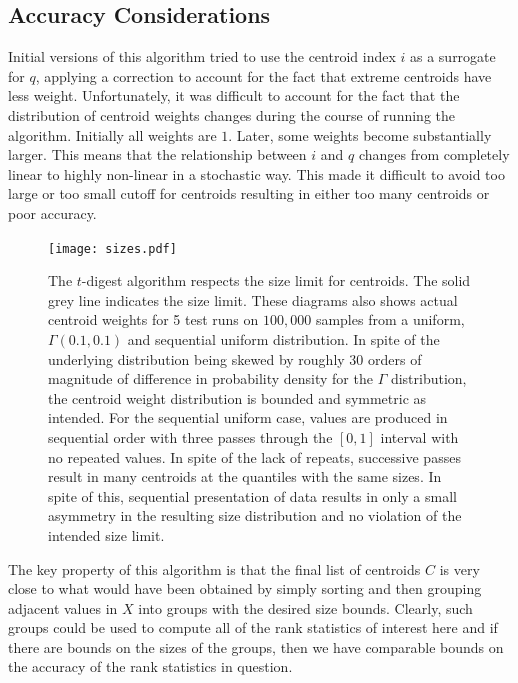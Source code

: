 \documentclass[11pt]{amsart}
\begin{document}
\subsection{Accuracy Considerations}
Initial versions of this algorithm tried to use the centroid index $i$ as a surrogate for $q$, applying a correction to account for the fact that extreme centroids have less weight.  Unfortunately, it was difficult to account for the fact that the distribution of centroid weights changes during the course of running the algorithm.  Initially all weights are $1$.  Later, some weights become substantially larger.  This means that the relationship between $i$ and $q$ changes from completely linear to highly non-linear in a stochastic way.  This made it difficult to avoid too large or too small cutoff for centroids resulting in either too many centroids or poor accuracy.
\begin{figure}[htb] %
   \centering
   \texttt{[image: sizes.pdf]} 
   \caption{The $t$-digest algorithm respects the size limit for centroids.  The solid grey line indicates the size limit.  These diagrams also shows actual centroid weights for 5 test runs on $100,000$ samples from a uniform, $\Gamma(0.1, 0.1)$ and sequential uniform distribution.  In spite of the underlying distribution being skewed by roughly $30$ orders of magnitude of difference in probability density for the $\Gamma$ distribution, the centroid weight distribution is bounded and symmetric as intended.  For the sequential uniform case, values are produced in sequential order with three passes through the $[0,1]$ interval with no repeated values.  In spite of the lack of repeats, successive passes result in many centroids at the quantiles with the same sizes.  In spite of this, sequential presentation of data results in only a small asymmetry in the resulting size distribution and no violation of the intended size limit.}
   \label{fig:gamma-sizes}
\end{figure}

The key property of this algorithm is that the final list of centroids $C$ is very close to what would have been obtained by simply sorting and then grouping adjacent values in $X$ into groups with the desired size bounds.  Clearly, such groups could be used to compute all of the rank statistics of interest here and if there are bounds on the sizes of the groups, then we have comparable bounds on the accuracy of the rank statistics in question.
\end{document}
